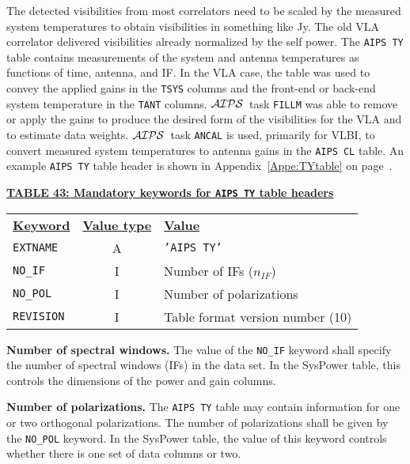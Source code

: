 \documentclass[twoside]{article}
\newcommand{\AIPS}{{$\cal AIPS\/$}}
\newcommand{\nif}{$n_{IF}$}
\begin{document}
The detected visibilities from most correlators need to be scaled by
the measured system temperatures to obtain visibilities in something
like Jy.  The old VLA correlator delivered visibilities already
normalized by the self power.  The {\tt AIPS TY} table contains
measurements of the system and antenna temperatures as functions of
time, antenna, and IF\@.  In the VLA case, the table was used to
convey the applied gains in the {\tt TSYS} columns and the front-end
or back-end system temperature in the {\tt TANT} columns.  \AIPS\ task
{\tt FILLM} was able to remove or apply the gains to produce the
desired form of the visibilities for the VLA and to estimate data
weights.  \AIPS\ task {\tt ANCAL} is used, primarily for VLBI, to
convert measured system temperatures to antenna gains in the {\tt AIPS
  CL} table.  An example {\tt AIPS TY} table header is shown in
Appendix~\ref{Appe:TYtable} on page~\pageref{Appe:TYtable}.

\begin{center}
\underline{\bf{TABLE 43: Mandatory keywords for {\tt AIPS TY} table
    headers}}\\
\begin{tabular}{lcl}
\noalign{\vspace{2pt}} \label{ta:TYkeys}
\underline{{\bf Keyword}} & \underline{\bf{Value type}} &
    \underline{\bf{Value\vphantom{y}}} \\
\noalign{\vspace{2pt}}
{\tt EXTNAME}   & A & {\tt 'AIPS TY'}  \\
{\tt NO\_IF}    & I & Number of IFs (\nif)\\
{\tt NO\_POL}   & I & Number of polarizations \\
{\tt REVISION}  & I & Table format version number (10)
\end{tabular}
\end{center}

{\bf Number of spectral windows.} The value of the {\tt NO\_IF}
keyword shall specify the number of spectral windows (IFs) in the data
set.  In the SysPower table, this controls the dimensions of the
power and gain columns.

{\bf Number of polarizations.}  The {\tt AIPS TY} table may contain
information for one or two orthogonal polarizations.  The number of
polarizations shall be given by the {\tt NO\_POL} keyword.   In the
SysPower table, the value of this keyword controls whether there is
one set of data columns or two.
\end{document}
